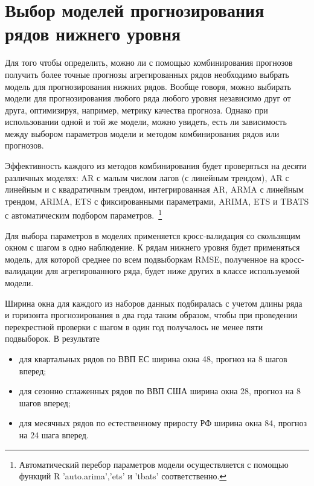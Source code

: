 \documentclass[12pt,a4paper, oneside]{extreport}
\begin{document}

\section{Выбор моделей прогнозирования рядов нижнего уровня}

Для того чтобы определить, можно ли с помощью комбинирования прогнозов получить более точные прогнозы агрегированных рядов необходимо выбрать модель для прогнозирования нижних рядов. 
Вообще говоря, можно выбирать модели для прогнозирования любого ряда любого уровня независимо друг от друга, оптимизируя, например, метрику качества прогноза. Однако при использовании одной и той же модели, можно  увидеть, есть ли зависимость между выбором параметров модели и методом комбинирования рядов или прогнозов.

Эффективность каждого из методов комбинирования будет проверяться на десяти различных моделях: AR с малым числом лагов (с линейным трендом), AR с линейным и с квадратичным трендом, интегрированная AR, ARMA с линейным трендом, ARIMA, 
ETS с фиксированными параметрами,  ARIMA, ETS и TBATS с автоматическим подбором параметров.~\footnote{Автоматический перебор параметров модели осуществляется с помощью функций R  'auto.arima','ets' и 'tbats' соответственно. }



Для выбора параметров в моделях применяется кросс-валидация  со скользящим окном с шагом в одно наблюдение. К рядам нижнего уровня будет применяться модель, для которой среднее по всем подвыборкам RMSE, полученное на кросс-валидации для   агрегированного ряда, будет ниже других в классе используемой модели.  





		
Ширина окна для каждого из  наборов данных подбиралась с учетом  длины ряда и горизонта прогнозирования в два года таким образом, чтобы при проведении перекрестной проверки с шагом в один год получалось не менее пяти подвыборок. В результате
		\begin{itemize}
			\item для квартальных рядов по ВВП ЕС ширина окна 48, прогноз на 8 шагов вперед;
			\item для  сезонно сглаженных рядов по ВВП США ширина окна 28, прогноз на 8 шагов вперед;
			\item для месячных рядов по естественному приросту РФ ширина окна 84, прогноз на 24 шага вперед.
		\end{itemize}  
		
\end{document}
